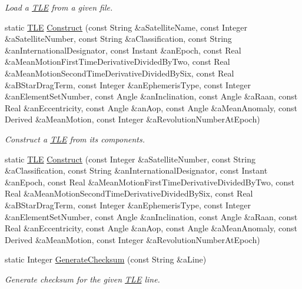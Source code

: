 \begin{DoxyCompactItemize}
\begin{DoxyCompactList}\small\item\em Load a \hyperlink{classostk_1_1astro_1_1trajectory_1_1orbit_1_1models_1_1sgp4_1_1_t_l_e}{T\+LE} from a given file. \end{DoxyCompactList}\item 
static \hyperlink{classostk_1_1astro_1_1trajectory_1_1orbit_1_1models_1_1sgp4_1_1_t_l_e}{T\+LE} \hyperlink{classostk_1_1astro_1_1trajectory_1_1orbit_1_1models_1_1sgp4_1_1_t_l_e_abcf23b65737dcbae8c52d54a88c1f76e}{Construct} (const String \&a\+Satellite\+Name, const Integer \&a\+Satellite\+Number, const String \&a\+Classification, const String \&an\+International\+Designator, const Instant \&an\+Epoch, const Real \&a\+Mean\+Motion\+First\+Time\+Derivative\+Divided\+By\+Two, const Real \&a\+Mean\+Motion\+Second\+Time\+Derivative\+Divided\+By\+Six, const Real \&a\+B\+Star\+Drag\+Term, const Integer \&an\+Ephemeris\+Type, const Integer \&an\+Element\+Set\+Number, const Angle \&an\+Inclination, const Angle \&a\+Raan, const Real \&an\+Eccentricity, const Angle \&an\+Aop, const Angle \&a\+Mean\+Anomaly, const Derived \&a\+Mean\+Motion, const Integer \&a\+Revolution\+Number\+At\+Epoch)
\begin{DoxyCompactList}\small\item\em Construct a \hyperlink{classostk_1_1astro_1_1trajectory_1_1orbit_1_1models_1_1sgp4_1_1_t_l_e}{T\+LE} from its components. \end{DoxyCompactList}\item 
static \hyperlink{classostk_1_1astro_1_1trajectory_1_1orbit_1_1models_1_1sgp4_1_1_t_l_e}{T\+LE} \hyperlink{classostk_1_1astro_1_1trajectory_1_1orbit_1_1models_1_1sgp4_1_1_t_l_e_ac772bf8fc68aa1cb0f8c17a2755165ed}{Construct} (const Integer \&a\+Satellite\+Number, const String \&a\+Classification, const String \&an\+International\+Designator, const Instant \&an\+Epoch, const Real \&a\+Mean\+Motion\+First\+Time\+Derivative\+Divided\+By\+Two, const Real \&a\+Mean\+Motion\+Second\+Time\+Derivative\+Divided\+By\+Six, const Real \&a\+B\+Star\+Drag\+Term, const Integer \&an\+Ephemeris\+Type, const Integer \&an\+Element\+Set\+Number, const Angle \&an\+Inclination, const Angle \&a\+Raan, const Real \&an\+Eccentricity, const Angle \&an\+Aop, const Angle \&a\+Mean\+Anomaly, const Derived \&a\+Mean\+Motion, const Integer \&a\+Revolution\+Number\+At\+Epoch)
\item 
static Integer \hyperlink{classostk_1_1astro_1_1trajectory_1_1orbit_1_1models_1_1sgp4_1_1_t_l_e_a4f9d8d752fc3700fd9bac043f106e19b}{Generate\+Checksum} (const String \&a\+Line)
\begin{DoxyCompactList}\small\item\em Generate checksum for the given \hyperlink{classostk_1_1astro_1_1trajectory_1_1orbit_1_1models_1_1sgp4_1_1_t_l_e}{T\+LE} line. \end{DoxyCompactList}\end{DoxyCompactItemize}
